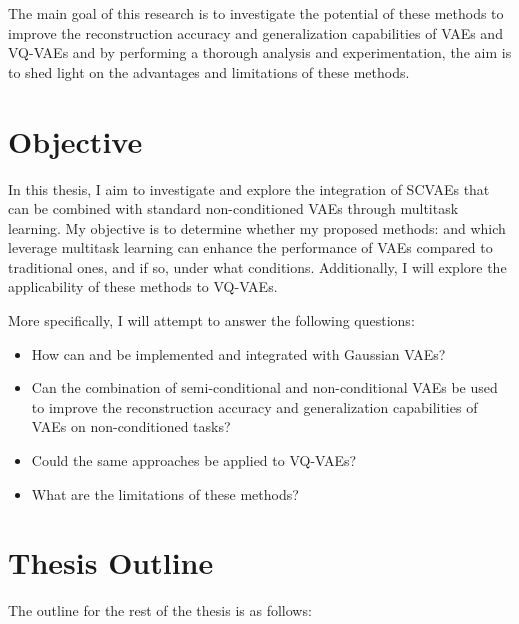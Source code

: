 The main goal of this research is to investigate the potential of these methods to improve the reconstruction accuracy and generalization capabilities of VAEs and VQ-VAEs and by performing a thorough analysis and experimentation, the aim is to shed light on the advantages and limitations of these methods.

\section{Objective}

In this thesis, I aim to investigate and explore the integration of SCVAEs that can be combined with standard non-conditioned VAEs through multitask learning. My objective is to determine whether my proposed methods: and  which leverage multitask learning can enhance the performance of VAEs compared to traditional ones, and if so, under what conditions. Additionally, I will explore the applicability of these methods to VQ-VAEs.

More specifically, I will attempt to answer the following questions:

\begin{itemize}
    \item How can  and  be implemented and integrated with Gaussian VAEs?
    \item Can the combination of semi-conditional and non-conditional VAEs be used to improve the reconstruction accuracy and generalization capabilities of VAEs on non-conditioned tasks?
    \item Could the same approaches be applied to VQ-VAEs?
    \item What are the limitations of these methods?

\end{itemize}

\section{Thesis Outline}

The outline for the rest of the thesis is as follows:

